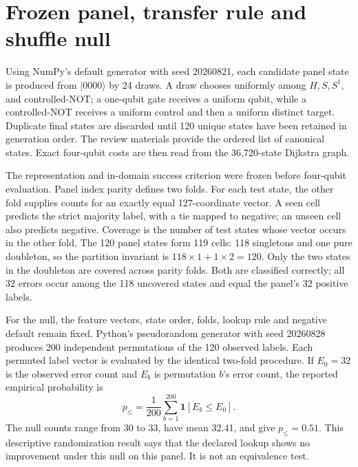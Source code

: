 \documentclass[a4paper,onecolumn,11pt,unpublished,noarxiv]{quantumarticle}
\begin{document}
\StateCountsTable
\FloatBarrier

\section{Frozen panel, transfer rule and shuffle null}\label{sec:null}

Using NumPy's default generator with seed 20260821, each candidate panel state is produced from $|0000\rangle$ by 24 draws.  A draw chooses uniformly among $H,S,S^\dagger,$ and controlled-NOT; a one-qubit gate receives a uniform qubit, while a controlled-NOT receives a uniform control and then a uniform distinct target.  Duplicate final states are discarded until 120 unique states have been retained in generation order.  The review materials provide the ordered list of canonical states.  Exact four-qubit costs are then read from the 36,720-state Dijkstra graph.

The representation and in-domain success criterion were frozen before four-qubit evaluation.  Panel index parity defines two folds.  For each test state, the other fold supplies counts for an exactly equal 127-coordinate vector.  A seen cell predicts the strict majority label, with a tie mapped to negative; an unseen cell also predicts negative.  Coverage is the number of test states whose vector occurs in the other fold.  The 120 panel states form 119 cells: 118 singletons and one pure doubleton, so the partition invariant is $118\times1+1\times2=120$.  Only the two states in the doubleton are covered across parity folds.  Both are classified correctly; all 32 errors occur among the 118 uncovered states and equal the panel's 32 positive labels.

For the null, the feature vectors, state order, folds, lookup rule and negative default remain fixed.  Python's pseudorandom generator with seed 20260828 produces 200 independent permutations of the 120 observed labels.  Each permuted label vector is evaluated by the identical two-fold procedure.  If $E_0=32$ is the observed error count and $E_b$ is permutation $b$'s error count, the reported empirical probability is
\begin{equation}
p_{\le}=\frac1{200}\sum_{b=1}^{200}\mathbf1[E_b\le E_0].
\end{equation}
The null counts range from 30 to 33, have mean 32.41, and give $p_{\le}=0.51$.  This descriptive randomization result says that the declared lookup shows no improvement under this null on this panel.  It is not an equivalence test.
\end{document}
